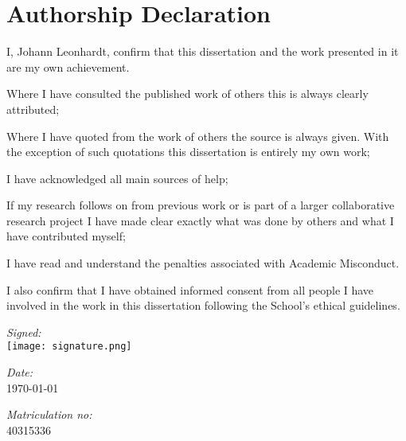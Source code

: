 \section*{Authorship Declaration}
\vspace{0.5cm}
\begin{flushleft}
I, Johann Leonhardt, confirm that this dissertation and the work presented in it are my own achievement.\newline

Where I have consulted the published work of others this is always clearly attributed;\newline

Where I have quoted from the work of others the source is always given. With the exception of such quotations this dissertation is entirely my own work;\newline

I have acknowledged all main sources of help;\newline

If my research follows on from previous work or is part of a larger collaborative research project I have made clear exactly what was done by others and what I have contributed myself;\newline

I have read and understand the penalties associated with Academic Misconduct.\newline

I also confirm that I have obtained informed consent from all people I have involved in the work in this dissertation following the School's ethical guidelines.\newline
\end{flushleft}

\begin{flushleft} \large
\emph{Signed:}\\ \texttt{[image: signature.png]}
\end{flushleft}

\vspace{.5cm}

\begin{flushleft} \large
\emph{Date:}\\ \today
\end{flushleft}

\vspace{.5cm}

\begin{flushleft} \large
\emph{Matriculation no:}\\ 40315336
\end{flushleft}
